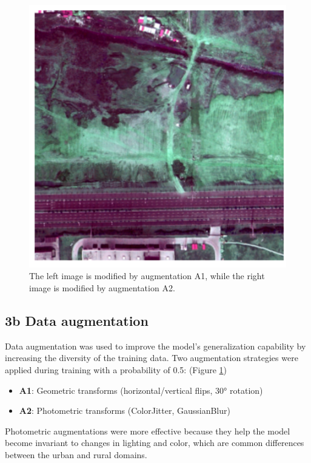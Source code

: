 \documentclass{article}
\begin{document}
\begin{multicols}{2}
\begin{figure}[H]
\begin{minipage}{0.48\linewidth}
		
	\end{minipage}
	\begin{minipage}{0.48\linewidth}
		\centering
		\includegraphics[width=1\linewidth]{image/aug/3_aug2.png}
		
		
	\end{minipage}
	\caption{The left image is modified by augmentation A1, while the right image is modified by augmentation A2.}
	
	\label{fig:data_aug}

\end{figure}


		\subsection{3b Data augmentation}
		Data augmentation was used to improve the model's generalization capability by increasing the diversity of the training data. Two augmentation strategies were applied during training with a probability of 0.5:
		(Figure \ref{fig:data_aug})
		
		
		\begin{itemize}
			\item \textbf{A1}: Geometric transforms (horizontal/vertical flips, 30° rotation)
			\item \textbf{A2}: Photometric transforms (ColorJitter, GaussianBlur)
		\end{itemize}
		Photometric augmentations were more effective because they help the model become invariant to changes in lighting and color, which are common differences between the urban and rural domains.
		

\end{multicols}
\end{document}
